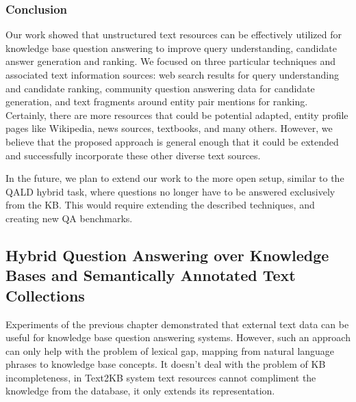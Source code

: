 \subsubsection{Conclusion}
\label{subsubsec:text2kb:conclusion}

Our work showed that unstructured text resources can be effectively utilized for knowledge base question answering to improve query understanding,  candidate answer generation and ranking.
We focused on three particular techniques and associated text information sources: web search results for query understanding and candidate ranking, community question answering data for candidate generation, and text fragments around entity pair mentions for ranking. Certainly, there are more resources that could be potential adapted, \eg entity profile pages like Wikipedia, news sources, textbooks, and many others. However, we believe that the proposed approach is general enough that it could be extended and successfully incorporate these other diverse text sources.

In the future, we plan to extend our work to the more open setup, similar to the QALD hybrid task, where questions no longer have to be answered exclusively from the KB. This would require extending the described techniques, and creating new QA benchmarks.


\subsection{Hybrid Question Answering over Knowledge Bases and Semantically Annotated Text Collections}
\label{subsec:text+kb}

Experiments of the previous chapter demonstrated that external text data can be useful for knowledge base question answering systems.
However, such an approach can only help with the problem of lexical gap, \ie mapping from natural language phrases to knowledge base concepts.
It doesn't deal with the problem of KB incompleteness, \ie in Text2KB system text resources cannot compliment the knowledge from the database, it only extends its representation.

